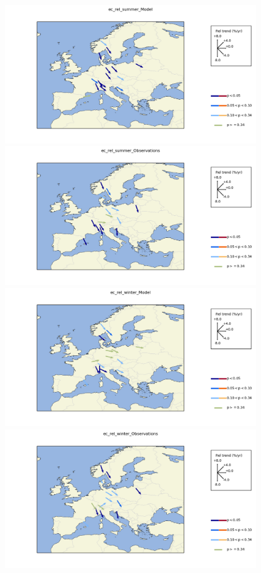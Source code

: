 \begin{figure}
\includegraphics*[height=6cm,trim=3cm 0 0 0]{FIGS_TRENDS/Plot_ec_rel_summer_Model.png}%
\includegraphics*[height=6cm,trim=3cm 0 6.5cm 0]{FIGS_TRENDS/Plot_ec_rel_summer_Observations.png}
\\
\includegraphics*[height=6cm,trim=3cm 0 0 0]{FIGS_TRENDS/Plot_ec_rel_winter_Model.png}%
\includegraphics*[height=6cm,trim=3cm 0 6.5cm 0]{FIGS_TRENDS/Plot_ec_rel_winter_Observations.png}

\end{figure}
